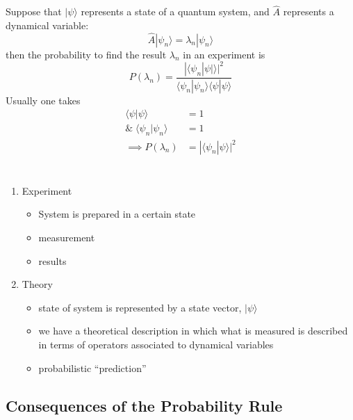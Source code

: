 \documentclass[a4paper,11pt,normalem]{article}
\begin{document}
Suppose that \(|\psi\rangle\) represents a state of a quantum system,
and \(\hat{A}\) represents a dynamical variable:
\[
    \hat{A}|\psi_n\rangle = \lambda_n|\psi_n\rangle
\]
then the probability to find the result \(\lambda_n\) in an experiment is
\[
    P(\lambda_n) = \frac{|\langle\psi_n|\psi|\rangle|^2}{\langle\psi_n|\psi_n\rangle\langle\psi|\psi\rangle}
\]
Usually one takes
\[
    \begin{aligned}
    \langle{\psi|\psi\rangle} &= 1 \\
    \& \; \langle\psi_n|\psi_n\rangle &= 1 \\
    \implies P(\lambda_n) &= |\langle\psi_n|\psi\rangle|^2
    \end{aligned}
\]

\section{}\label{lecture-7}

\begin{enumerate}
\item
  Experiment
  \begin{itemize}
  \item
    System is prepared in a certain state
  \item
    measurement
  \item
    results
  \end{itemize}
\item
  Theory
  \begin{itemize}
  \item
    state of system is represented by a state vector, \(|\psi\rangle\)
  \item
    we have a theoretical description in which what is measured is described in
    terms of operators associated to dynamical variables
  \item
    probabilistic ``prediction''
  \end{itemize}
\end{enumerate}

\subsection{Consequences of the Probability Rule}\label{consequences-of-the-probability-rule}
\end{document}
